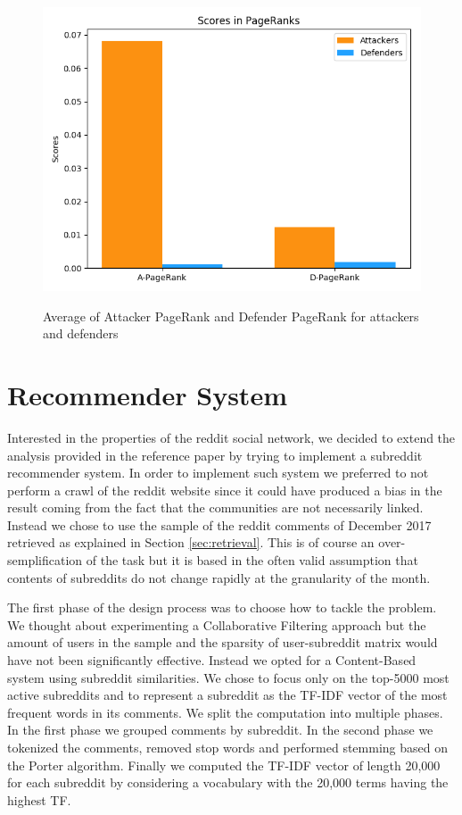 \documentclass{article}
\begin{document}
\begin{figure}[h]
\centering
\includegraphics[width=0.4\linewidth]{hist.png} \\
\caption{Average of Attacker PageRank and Defender PageRank for attackers and
defenders}
\label{fig:hist}
\end{figure}

\section{Recommender System}

Interested in the properties of the reddit social network, we decided to extend
the analysis provided in the reference paper by trying to implement a
subreddit recommender system. In order
to implement such system we preferred to not perform a crawl of the reddit
website since it could have produced a bias in the result coming from the fact
that the communities are not necessarily linked. Instead we chose to use the
sample of the reddit comments of December 2017 retrieved as explained in Section
\ref{sec:retrieval}. This is of course an over-semplification of the task but it
is based in the often valid assumption that contents of subreddits do not change
rapidly at the granularity of the month.

The first phase of the design process was to choose how to tackle the problem.
We thought about experimenting a Collaborative Filtering approach but the amount
of users in the sample and the sparsity of user-subreddit matrix would have not
been significantly effective. Instead we opted for a Content-Based system using
subreddit similarities. We chose to focus only on the top-5000 most active
subreddits and to represent a subreddit as the TF-IDF vector
of the most frequent words in its comments. We split the computation into
multiple phases. In the first phase we grouped comments by subreddit. In the
second phase we tokenized the comments, removed stop words and performed
stemming based on the Porter algorithm. Finally we computed the TF-IDF vector of
length 20,000 for each subreddit by considering a vocabulary with the 20,000
terms having the highest TF.
\end{document}
